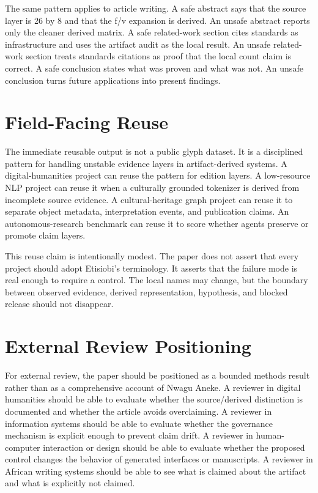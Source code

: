 \documentclass[sigconf,nonacm]{acmart}
\begin{document}
The same pattern applies to article writing. A safe abstract says that the
source layer is 26 by 8 and that the f/v expansion is derived. An unsafe abstract
reports only the cleaner derived matrix. A safe related-work section cites
standards as infrastructure and uses the artifact audit as the local result. An
unsafe related-work section treats standards citations as proof that the local
count claim is correct. A safe conclusion states what was proven and what was
not. An unsafe conclusion turns future applications into present findings.

\section{Field-Facing Reuse}
The immediate reusable output is not a public glyph dataset. It is a disciplined
pattern for handling unstable evidence layers in artifact-derived systems. A
digital-humanities project can reuse the pattern for edition layers. A
low-resource NLP project can reuse it when a culturally grounded tokenizer is
derived from incomplete source evidence. A cultural-heritage graph project can
reuse it to separate object metadata, interpretation events, and publication
claims. An autonomous-research benchmark can reuse it to score whether agents
preserve or promote claim layers.

This reuse claim is intentionally modest. The paper does not assert that every
project should adopt Etisiobi's terminology. It asserts that the failure mode is
real enough to require a control. The local names may change, but the boundary
between observed evidence, derived representation, hypothesis, and blocked
release should not disappear.

\section{External Review Positioning}
For external review, the paper should be positioned as a bounded methods result
rather than as a comprehensive account of Nwagu Aneke. A reviewer in digital
humanities should be able to evaluate whether the source/derived distinction is
documented and whether the article avoids overclaiming. A reviewer in
information systems should be able to evaluate whether the governance mechanism
is explicit enough to prevent claim drift. A reviewer in human-computer
interaction or design should be able to evaluate whether the proposed control
changes the behavior of generated interfaces or manuscripts. A reviewer in
African writing systems should be able to see what is claimed about the artifact
and what is explicitly not claimed.
\end{document}
